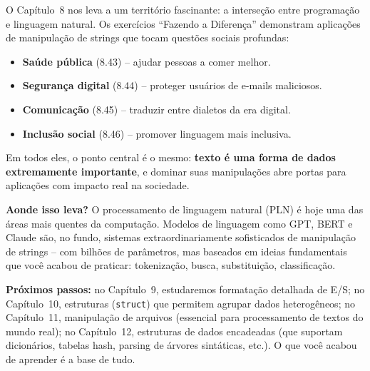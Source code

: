 \documentclass[12pt,a4paper]{article}
\begin{document}
\begin{tcolorbox}[colback=deitellightblue,colframe=deitelblue,
  title={\bfseries A computação a serviço da linguagem humana}]

O Capítulo~8 nos leva a um território fascinante: a interseção entre programação
e linguagem natural. Os exercícios ``Fazendo a Diferença'' demonstram aplicações
de manipulação de strings que tocam questões sociais profundas:

\begin{itemize}[noitemsep]
  \item \textbf{Saúde pública} (8.43) -- ajudar pessoas a comer melhor.
  \item \textbf{Segurança digital} (8.44) -- proteger usuários de e-mails maliciosos.
  \item \textbf{Comunicação} (8.45) -- traduzir entre dialetos da era digital.
  \item \textbf{Inclusão social} (8.46) -- promover linguagem mais inclusiva.
\end{itemize}

Em todos eles, o ponto central é o mesmo: \textbf{texto é uma forma de dados
extremamente importante}, e dominar suas manipulações abre portas para
aplicações com impacto real na sociedade.

\textbf{Aonde isso leva?} O processamento de linguagem natural (PLN) é hoje
uma das áreas mais quentes da computação. Modelos de linguagem como GPT, BERT
e Claude são, no fundo, sistemas extraordinariamente sofisticados de manipulação
de strings -- com bilhões de parâmetros, mas baseados em ideias fundamentais que
você acabou de praticar: tokenização, busca, substituição, classificação.

\end{tcolorbox}

\begin{boaprática}
\textbf{Próximos passos:} no Capítulo~9, estudaremos formatação detalhada de
E/S; no Capítulo~10, estruturas (\texttt{struct}) que permitem agrupar dados
heterogêneos; no Capítulo~11, manipulação de arquivos (essencial para
processamento de textos do mundo real); no Capítulo~12, estruturas de dados
encadeadas (que suportam dicionários, tabelas hash, parsing de árvores
sintáticas, etc.). O que você acabou de aprender é a base de tudo.
\end{boaprática}
\end{document}
